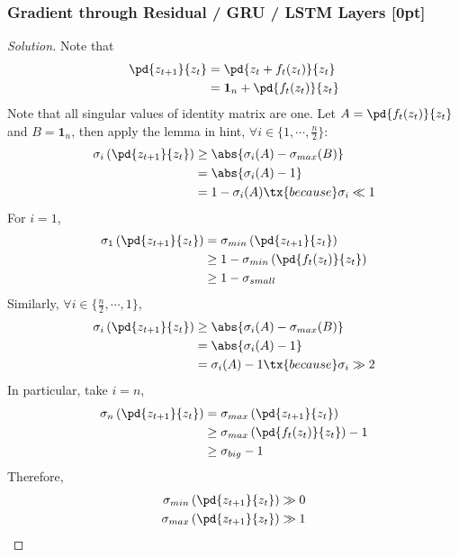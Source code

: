 \documentclass{article}
\begin{document}
	\subsubsection{Gradient through Residual / GRU / LSTM Layers [0pt]}
	\begin{proof}[Solution]
		Note that 
		\begin{align}
			\pd{z_{t+1}}{z_t} &= \pd{z_t + f_t(z_t)}{z_t} \\
			&= \mathbf{1}_n  + \pd{f_t(z_t)}{z_t}
		\end{align}
		Note that all singular values of identity matrix are one. Let $A = \pd{f_t(z_t)}{z_t}$ and $B = \mathbf{1}_n$, then apply the lemma in hint, $\forall i \in \{1, \cdots, \frac{n}{2}\}$:
		\begin{align}
			\sigma_i\left(\pd{z_{t+1}}{z_t}\right) &\geq \abs{\sigma_i(A) - \sigma_{max}(B)} \\
			&= \abs{\sigma_i(A) - 1} \\
			&= 1 - \sigma_i(A) \tx{ because } \sigma_i \ll 1
		\end{align}
		For $i=1$,
		\begin{align}
			\sigma_{1}\left(\pd{z_{t+1}}{z_t}\right) &= \sigma_{min}\left(\pd{z_{t+1}}{z_t}\right) \\
			&\geq 1 - \sigma_{min} \left(\pd{f_t(z_t)}{z_t}\right) \\
			&\geq 1 - \sigma_{small}
		\end{align}
		Similarly, $\forall i \in \{\frac{n}{2}, \cdots, 1\}$,
		\begin{align}
			\sigma_i\left(\pd{z_{t+1}}{z_t}\right) &\geq \abs{\sigma_i(A) - \sigma_{max}(B)} \\
			&= \abs{\sigma_i(A) - 1} \\
			&= \sigma_i(A) - 1 \tx{ because } \sigma_i \gg 2
		\end{align}
		In particular, take $i = n$,
		\begin{align}
			\sigma_{n}\left(\pd{z_{t+1}}{z_t}\right) &= \sigma_{max}\left(\pd{z_{t+1}}{z_t}\right) \\
			&\geq \sigma_{max} \left(\pd{f_t(z_t)}{z_t}\right) - 1 \\
			&\geq \sigma_{big} - 1
		\end{align}
		Therefore,
		\begin{align}
			\sigma_{min}\left(\pd{z_{t+1}}{z_t}\right) &\gg 0 \\
			\sigma_{max}\left(\pd{z_{t+1}}{z_t}\right) &\gg 1
		\end{align}
	\end{proof}
	
\end{document}
